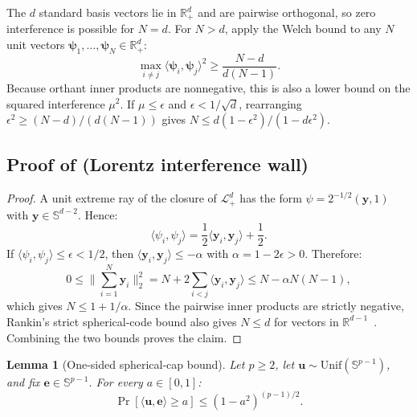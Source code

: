 \documentclass{article}
\newcommand{\1}{\bm{1}}
\newcommand{\norm}[1]{\lVert {#1} \rVert}
\newcommand{\lrangle}[1]{\langle#1\rangle}
\def\eps{{\epsilon}}
\def\ve{{\bm{e}}}
\def\vu{{\bm{u}}}
\def\vy{{\bm{y}}}
\def\gL{{\mathcal{L}}}
\newcommand{\R}{\mathbb{R}}
\newtheorem{lemma}[theorem]{Lemma}
\theoremstyle{definition}
\begin{document}
The $d$ standard basis vectors lie in $\R^d_+$ and are pairwise orthogonal, so zero interference is
possible for $N=d$. For $N>d$, apply the Welch bound to any $N$ unit vectors
$\bm{\psi}_1,\dots,\bm{\psi}_N\in\R^d_+$:
\[
  \max_{i\ne j}\lrangle{\bm{\psi}_i,\bm{\psi}_j}^2
  \ge \frac{N-d}{d(N-1)}.
\]
Because orthant inner products are nonnegative, this is also a lower bound on the squared interference
$\mu^2$. If $\mu\le\eps$ and $\eps<1/\sqrt d$, rearranging $\eps^2\ge(N-d)/(d(N-1))$ gives $N\le
  d(1-\eps^2)/(1-d\eps^2)$.

\subsection{\texorpdfstring{Proof of  (Lorentz interference wall)}{Proof of Lorentz interference wall}}

\begin{proof}
  A unit extreme ray of the closure of $\gL^d_{+}$ has the form
  $\psi=2^{-1/2}(\vy,1)$ with $\vy\in\mathbb{S}^{d-2}$. Hence:
  \[
    \lrangle{\psi_i,\psi_j}
      =\frac{1}{2}\lrangle{\vy_i,\vy_j}+\frac{1}{2}.
  \]
  If $\lrangle{\psi_i,\psi_j}\le\eps<1/2$, then
  $\lrangle{\vy_i,\vy_j}\le-\alpha$ with $\alpha=1-2\eps>0$. Therefore:
  \[
    0
    \le \norm{\sum_{i=1}^{N}\vy_i}_2^2
    = N+2\sum_{i<j}\lrangle{\vy_i,\vy_j}
    \le N-\alpha N(N-1),
  \]
  which gives $N\le1+1/\alpha$. Since the pairwise inner products are strictly negative,
  Rankin's strict spherical-code bound also gives $N\le d$ for vectors in
  $\R^{d-1}$~\citep{rankin55closest}. Combining the two bounds proves the claim.
\end{proof}

\begin{lemma}[One-sided spherical-cap bound]
  \label{lem:spherical-cap-bound}
  Let $p\ge2$, let $\vu\sim\mathrm{Unif}(\mathbb{S}^{p-1})$, and fix
  $\ve\in\mathbb{S}^{p-1}$. For every $a\in[0,1]$:
  \begin{equation}
    \Pr\!\left[\lrangle{\vu,\ve}\ge a\right]
    \le (1-a^2)^{(p-1)/2}.
    \label{eq:spherical-cap-bound}
  \end{equation}
\end{lemma}
\end{document}

